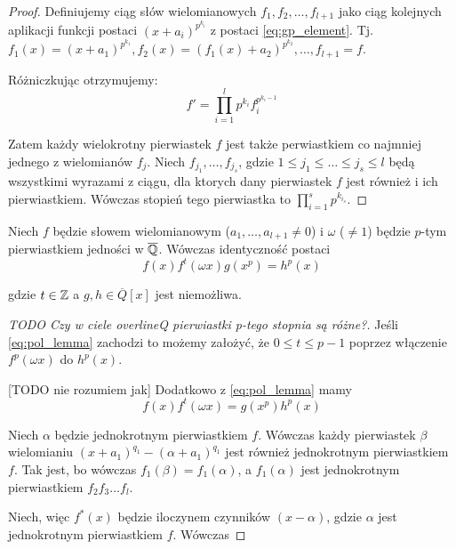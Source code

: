 \begin{proof}
Definiujemy ciąg słów wielomianowych $f_1, f_2, \ldots, f_{l+1}$ jako ciąg
kolejnych aplikacji funkcji postaci $(x+a_i)^{p^{k_i}}$ z postaci
\ref{eq:gp_element}. Tj. $f_1(x) = \left(x + a_1\right)^{p^{k_1}},
f_2(x) = \left(f_1(x) + a_2\right)^{p^{k_2}}, \ldots, f_{l+1} = f$.

Różniczkując otrzymujemy:
\[f' = \prod_{i=1}^l p^{k_i} f_i^{p^{k_i - 1}}\]

Zatem każdy wielokrotny pierwiastek $f$ jest także perwiastkiem co najmniej
jednego z wielomianów $f_j$. Niech $f_{j_1}, \ldots, f_{j_s}$, gdzie $1 \leq j_1
\leq \ldots \leq j_s \leq l$ będą wszystkimi wyrazami z ciągu, dla ktorych dany
pierwiastek $f$ jest również i ich pierwiastkiem. Wówczas stopień tego
pierwiastka to $\prod_{i=1}^s p^{k_{i_s}}$.
\end{proof}

\begin{lemma}
  Niech $f$ będzie słowem wielomianowym ($a_1, \ldots, a_{l+1} \neq 0$) i
  $\omega$ ($\neq 1$) będzie $p$-tym pierwiastkiem jedności w $\overline{\mathbb{Q}}$.
  Wówczas identyczność postaci
  \begin{equation}
    f(x)f^t(\omega x)g\left(x^p\right) = h^p(x)
    \label{eq:pol_lemma}
  \end{equation}

  gdzie $t \in \mathbb{Z}$ a $g, h \in \overline{Q}[x]$ jest niemożliwa.
\end{lemma}

\begin{proof}
  [TODO Czy w ciele overlineQ pierwiastki p-tego stopnia są różne?]

  Jeśli \ref{eq:pol_lemma} zachodzi to możemy założyć, że $0 \leq t \leq p - 1$
  poprzez włączenie $f^p(\omega x)$ do $h^p(x)$. 

  [TODO nie rozumiem jak] Dodatkowo z \ref{eq:pol_lemma} mamy
  \begin{equation}
    f(x)f^t(\omega x) = g\left(x^p\right)h^p(x)
    \label{eq:pol_lemma_right}
  \end{equation}

  Niech $\alpha$ będzie jednokrotnym pierwiastkiem $f$. Wówczas każdy
  pierwiastek $\beta$ wielomianiu $\left(x + a_1\right)^{q_1} - \left(\alpha +
  a_1\right)^{q_1}$ jest również jednokrotnym pierwiastkiem $f$. Tak jest, bo
  wówczas $f_1(\beta) = f_1(\alpha)$, a $f_1(\alpha)$ jest jednokrotnym
  pierwiastkiem $f_2f_3 \ldots f_{l}$.

  Niech, więc $f^*(x)$ będzie iloczynem czynników $(x-\alpha)$, gdzie $\alpha$
  jest jednokrotnym pierwiastkiem $f$. Wówczas
\end{proof}









